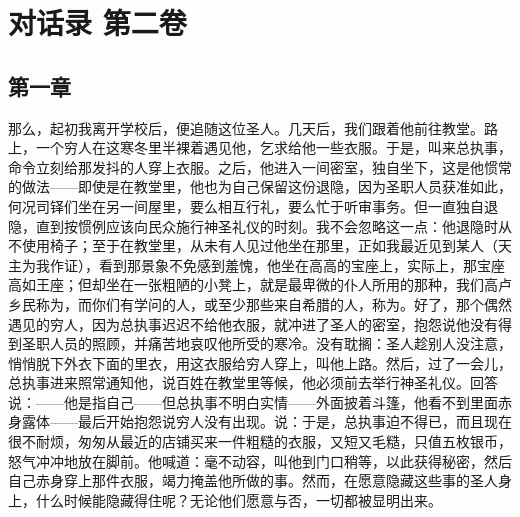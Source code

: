 \section{对话录 第二卷}

\par


\subsection{第一章}

那么，起初我离开学校后，便追随这位圣人。几天后，我们跟着他前往教堂。路上，一个穷人在这寒冬里半裸着遇见他，乞求给他一些衣服。于是，叫来总执事，命令立刻给那发抖的人穿上衣服。之后，他进入一间密室，独自坐下，这是他惯常的做法——即使是在教堂里，他也为自己保留这份退隐，因为圣职人员获准如此，何况司铎们坐在另一间屋里，要么相互行礼，要么忙于听审事务。但一直独自退隐，直到按惯例应该向民众施行神圣礼仪的时刻。我不会忽略这一点：他退隐时从不使用椅子；至于在教堂里，从未有人见过他坐在那里，正如我最近见到某人（天主为我作证），看到那景象不免感到羞愧，他坐在高高的宝座上，实际上，那宝座高如王座；但却坐在一张粗陋的小凳上，就是最卑微的仆人所用的那种，我们高卢乡民称为，而你们有学问的人，或至少那些来自希腊的人，称为。好了，那个偶然遇见的穷人，因为总执事迟迟不给他衣服，就冲进了圣人的密室，抱怨说他没有得到圣职人员的照顾，并痛苦地哀叹他所受的寒冷。没有耽搁：圣人趁别人没注意，悄悄脱下外衣下面的里衣，用这衣服给穷人穿上，叫他上路。然后，过了一会儿，总执事进来照常通知他，说百姓在教堂里等候，他必须前去举行神圣礼仪。回答说：——他是指自己——但总执事不明白实情——外面披着斗篷，他看不到里面赤身露体——最后开始抱怨说穷人没有出现。说：于是，总执事迫不得已，而且现在很不耐烦，匆匆从最近的店铺买来一件粗糙的衣服，又短又毛糙，只值五枚银币，怒气冲冲地放在脚前。他喊道：毫不动容，叫他到门口稍等，以此获得秘密，然后自己赤身穿上那件衣服，竭力掩盖他所做的事。然而，在愿意隐藏这些事的圣人身上，什么时候能隐藏得住呢？无论他们愿意与否，一切都被显明出来。\par


